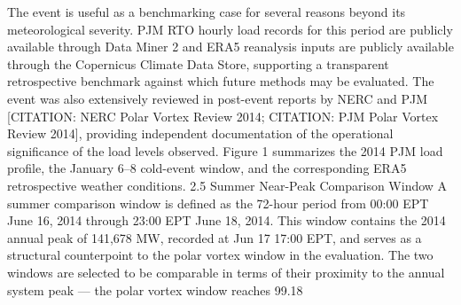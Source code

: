 The event is useful as a benchmarking case for several reasons beyond its meteorological severity. PJM RTO hourly load records for this period are publicly available through Data Miner 2 and ERA5 reanalysis inputs are publicly available through the Copernicus Climate Data Store, supporting a transparent retrospective benchmark against which future methods may be evaluated. The event was also extensively reviewed in post-event reports by NERC and PJM [CITATION: NERC Polar Vortex Review 2014; CITATION: PJM Polar Vortex Review 2014], providing independent documentation of the operational significance of the load levels observed.
Figure 1 summarizes the 2014 PJM load profile, the January 6–8 cold-event window, and the corresponding ERA5 retrospective weather conditions.
2.5 Summer Near-Peak Comparison Window
A summer comparison window is defined as the 72-hour period from 00:00 EPT June 16, 2014 through 23:00 EPT June 18, 2014. This window contains the 2014 annual peak of 141,678 MW, recorded at Jun 17 17:00 EPT, and serves as a structural counterpoint to the polar vortex window in the evaluation.
The two windows are selected to be comparable in terms of their proximity to the annual system peak — the polar vortex window reaches 99.18%